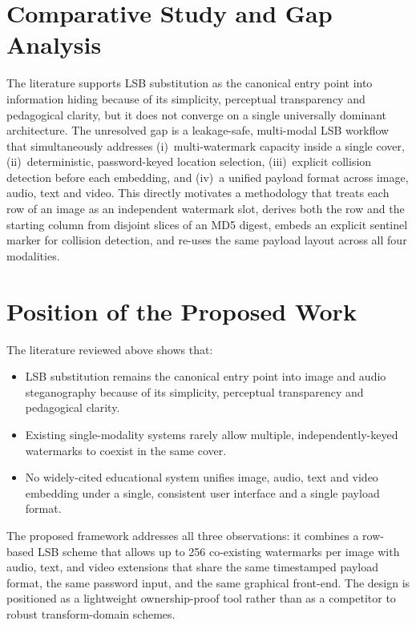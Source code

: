 \section{Comparative Study and Gap Analysis}

The literature supports LSB substitution as the canonical entry point into information hiding because of its simplicity, perceptual transparency and pedagogical clarity, but it does not converge on a single universally dominant architecture. The unresolved gap is a leakage-safe, multi-modal LSB workflow that simultaneously addresses (i)~multi-watermark capacity inside a single cover, (ii)~deterministic, password-keyed location selection, (iii)~explicit collision detection before each embedding, and (iv)~a unified payload format across image, audio, text and video. This directly motivates a methodology that treats each row of an image as an independent watermark slot, derives both the row and the starting column from disjoint slices of an MD5 digest, embeds an explicit sentinel marker for collision detection, and re-uses the same payload layout across all four modalities.

\section{Position of the Proposed Work}

The literature reviewed above shows that:

\begin{itemize}
    \item LSB substitution remains the canonical entry point into image and audio steganography because of its simplicity, perceptual transparency and pedagogical clarity.
    \item Existing single-modality systems rarely allow multiple, independently-keyed watermarks to coexist in the same cover.
    \item No widely-cited educational system unifies image, audio, text and video embedding under a single, consistent user interface and a single payload format.
\end{itemize}

The proposed framework addresses all three observations: it combines a row-based LSB scheme that allows up to 256 co-existing watermarks per image with audio, text, and video extensions that share the same timestamped payload format, the same password input, and the same graphical front-end. The design is positioned as a lightweight ownership-proof tool rather than as a competitor to robust transform-domain schemes.


